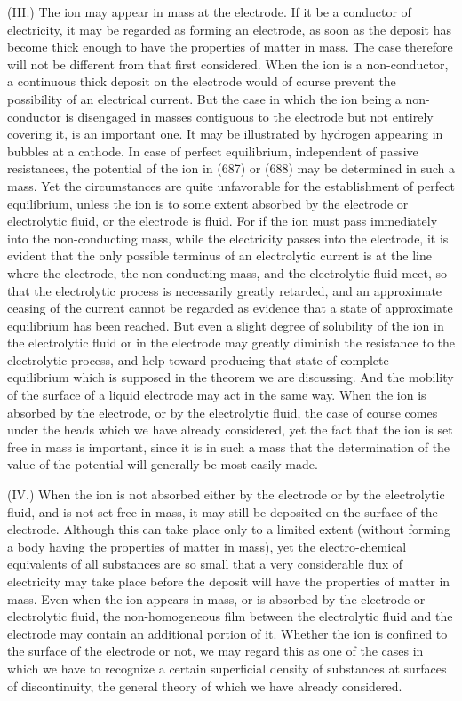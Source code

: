 \documentclass[12pt]{memoir}
\begin{document}
(III.) The ion may appear in mass at the electrode. If it be a conductor of electricity, it may be regarded as forming an electrode, as soon as the deposit has become thick enough to have the properties of matter in mass. The case therefore will not be different from that first considered. When the ion is a non-conductor, a continuous thick deposit on the electrode would of course prevent the possibility of an electrical current. But the case in which the ion being a non-conductor is disengaged in masses contiguous to the electrode but not entirely covering it, is an important one. It may be illustrated by hydrogen appearing in bubbles at a cathode. In case of perfect equilibrium, independent of passive resistances, the potential of the ion in (687) or (688) may be determined in such a mass. Yet the circumstances are quite unfavorable for the establishment of perfect equilibrium, unless the ion is to some extent absorbed by the electrode or electrolytic fluid, or the electrode is fluid. For if the ion must pass immediately into the non-conducting mass, while the electricity passes into the electrode, it is evident that the only possible terminus of an electrolytic current is at the line where the electrode, the non-conducting mass, and the electrolytic fluid meet, so that the electrolytic process is necessarily greatly retarded, and an approximate ceasing of the current cannot be regarded as evidence that a state of approximate equilibrium has been reached. But even a slight degree of solubility of the ion in the electrolytic fluid or in the electrode may greatly diminish the resistance to the electrolytic process, and help toward producing that state of complete equilibrium which is supposed in the theorem we are discussing. And the mobility of the surface of a liquid electrode may act in the same way. When the ion is absorbed by the electrode, or by the electrolytic fluid, the case of course comes under the heads which we have already considered, yet the fact that the ion is set free in mass is important, since it is in such a mass that the determination of the value of the potential will generally be most easily made.

(IV.) When the ion is not absorbed either by the electrode or by the electrolytic fluid, and is not set free in mass, it may still be deposited on the surface of the electrode. Although this can take place only to a limited extent (without forming a body having the properties of matter in mass), yet the electro-chemical equivalents of all substances are so small that a very considerable flux of electricity may take place before the deposit will have the properties of matter in mass. Even when the ion appears in mass, or is absorbed by the electrode or electrolytic fluid, the non-homogeneous film between the electrolytic fluid and the electrode may contain an additional portion of it. Whether the ion is confined to the surface of the electrode or not, we may regard this as one of the cases in which we have to recognize a certain superficial density of substances at surfaces of discontinuity, the general theory of which we have already considered.
\end{document}

